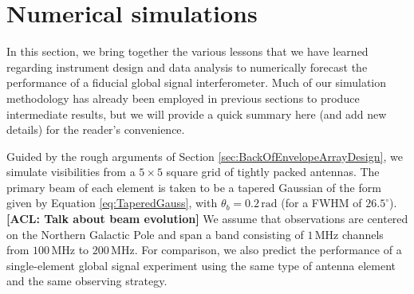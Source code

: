 \documentclass[twolcolumn,apj,iop,numberedappendix]{emulateapj}
\newcommand{\R}{\mathbf{R}}
\newcommand{\rhat}{\hat{\mathbf{r}}}
\newcommand{\acl}[1]{{\color{red} \textbf{[ACL:  #1]}}}
\newcommand{\mep}[1]{{\color{applegreen} \textbf{[MEP:  #1]}}}
\begin{document}
%
%
%
%

\section{Numerical simulations}
\label{sec:SimResults}

In this section, we bring together the various lessons that we have learned regarding instrument design and data analysis to numerically forecast the performance of a fiducial global signal interferometer. Much of our simulation methodology has already been employed in previous sections to produce intermediate results, but we will provide a quick summary here (and add new details) for the reader's convenience.

Guided by the rough arguments of Section \ref{sec:BackOfEnvelopeArrayDesign}, we simulate visibilities from a $5\times5$ square grid of tightly packed antennas. The primary beam of each element is taken to be a tapered Gaussian of the form given by Equation \eqref{eq:TaperedGauss}, with $\theta_b = 0.2\,\textrm{rad}$ (for a FWHM of $26.5^\circ$). \acl{Talk about beam evolution} We assume that observations are centered on the Northern Galactic Pole and span a band consisting of $1\,\textrm{MHz}$ channels from $100\,\textrm{MHz}$ to $200\,\textrm{MHz}$. For comparison, we also predict the performance of a single-element global signal experiment using the same type of antenna element and the same observing strategy.
\end{document}
